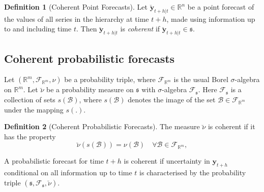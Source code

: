 \documentclass[12pt]{article}
\theoremstyle{definition}
\newtheorem{definition}{Definition}[section]
\begin{document}
\begin{definition}[Coherent Point Forecasts]\label{def:cohpoint}
  Let $\breve{\bm{y}}_{t+h|t} \in \mathbb{R}^n$ be a point forecast of the values of all series in the hierarchy at time $t+h$, made using information up to and including time $t$. Then $\breve{\bm{y}}_{t+h|t}$ is \emph{coherent} if $\breve{\bm{y}}_{t+h|t} \in \mathfrak{s}$.
\end{definition}

\subsection{Coherent probabilistic forecasts}\label{sec:cohprobf}

Let $(\mathbb{R}^m, \mathscr{F}_{\mathbb{R}^m}, \nu)$ be a probability triple, where $\mathscr{F}_{\mathbb{R}^m}$ is the usual Borel $\sigma$-algebra on $\mathbb{R}^m$. Let $\breve{\nu}$ be a probability measure on $\mathfrak{s}$ with $\sigma$-algebra $\mathscr{F}_{\mathfrak{s}}$. Here $\mathscr{F}_{\mathfrak{s}}$ is a collection of sets $s(\mathcal{B})$, where $s(\mathcal{B})$ denotes the image of the set $\mathcal{B}\in \mathscr{F}_{\mathbb{R}^m}$ under the mapping $s(.)$.

\begin{definition}[Coherent Probabilistic Forecasts]\label{def:cohprob}
  The measure $\breve{\nu}$ is coherent if it has the property
  \[
    \breve{\nu}(s(\mathcal{B})) = \nu(\mathcal{B}) \quad \forall \mathcal{B} \in \mathscr{F}_{\mathbb{R}^m},
  \]
\end{definition}

A probabilistic forecast for time $t+h$ is coherent if uncertainty in $\bm{y}_{t+h}$ conditional on all information up to time $t$ is characterised by the probability triple $(\mathfrak{s},\mathscr{F}_{\mathfrak{s}},\breve{\nu})$.



\end{document}
